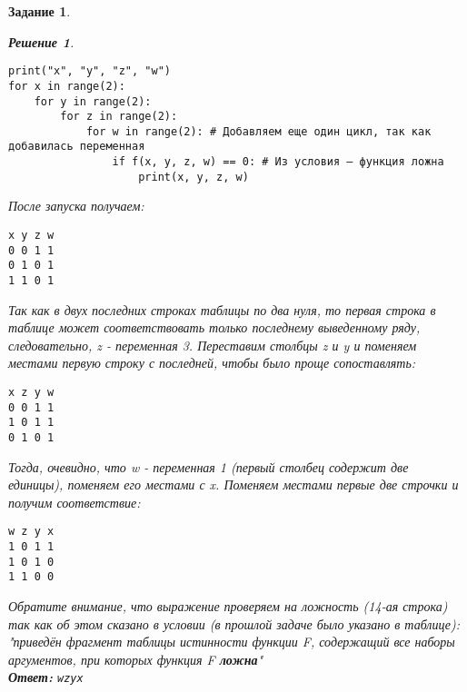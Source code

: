\documentclass[12pt]{article}
\theoremstyle{problem_style}
\newtheorem{problem}{Задание}[subsection]
\newtheorem{solution}{Решение}[subsection]
\begin{document}
\begin{problem}
\begin{solution}
\begin{verbatim}
print("x", "y", "z", "w")
for x in range(2): 
    for y in range(2):
        for z in range(2): 
            for w in range(2): # Добавляем еще один цикл, так как добавилась переменная
                if f(x, y, z, w) == 0: # Из условия — функция ложна
                    print(x, y, z, w)
\end{verbatim}
После запуска получаем:
\begin{verbatim}
x y z w
0 0 1 1
0 1 0 1
1 1 0 1
\end{verbatim}
Так как в двух последних строках таблицы по два нуля, то первая строка в таблице может соответствовать только последнему выведенному ряду, следовательно, z - переменная 3. Переставим столбцы z и y и поменяем местами первую строку с последней, чтобы было проще сопоставлять:
\begin{verbatim}
x z y w
0 0 1 1
1 0 1 1
0 1 0 1
\end{verbatim}
Тогда, очевидно, что w - переменная 1 (первый столбец содержит две единицы), поменяем его местами с x. Поменяем местами первые две строчки и получим соответствие:
\begin{verbatim}
w z y x
1 0 1 1
1 0 1 0
1 1 0 0
\end{verbatim}
Обратите внимание, что выражение проверяем на ложность (14-ая строка) так как об этом сказано в условии (в прошлой задаче было указано в таблице): \textit{"приведён фрагмент таблицы истинности функции F, содержащий все наборы аргументов, при которых функция F \textbf{ложна}"}\\
\textbf{Ответ:} \texttt{wzyx}
\end{solution}
\end{problem}
\end{document}
